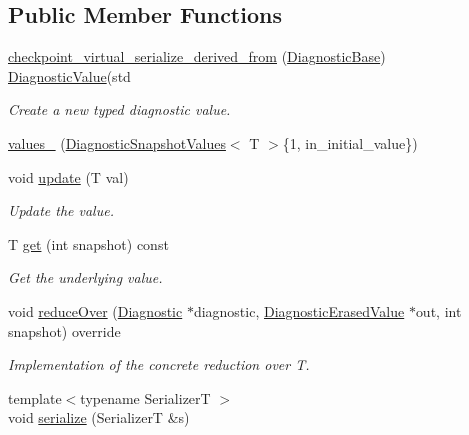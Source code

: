 \subsection*{Public Member Functions}
\begin{DoxyCompactItemize}
\item 
\hyperlink{structvt_1_1runtime_1_1component_1_1detail_1_1_diagnostic_value_a93e99556ebd3b6ec6a23d63dcd4cf81a}{checkpoint\+\_\+virtual\+\_\+serialize\+\_\+derived\+\_\+from} (\hyperlink{structvt_1_1runtime_1_1component_1_1detail_1_1_diagnostic_base}{Diagnostic\+Base}) \hyperlink{structvt_1_1runtime_1_1component_1_1detail_1_1_diagnostic_value}{Diagnostic\+Value}(std
\begin{DoxyCompactList}\small\item\em Create a new typed diagnostic value. \end{DoxyCompactList}\item 
\hyperlink{structvt_1_1runtime_1_1component_1_1detail_1_1_diagnostic_value_afb539e5bf7b2a7cc09298f731c6705a3}{values\+\_\+} (\hyperlink{structvt_1_1runtime_1_1component_1_1detail_1_1_diagnostic_snapshot_values}{Diagnostic\+Snapshot\+Values}$<$ T $>$\{1, in\+\_\+initial\+\_\+value\})
\item 
void \hyperlink{structvt_1_1runtime_1_1component_1_1detail_1_1_diagnostic_value_a7d976c2d528e5780520ee1f1b8dfddb9}{update} (T val)
\begin{DoxyCompactList}\small\item\em Update the value. \end{DoxyCompactList}\item 
T \hyperlink{structvt_1_1runtime_1_1component_1_1detail_1_1_diagnostic_value_aef8559dc2c3acb7ac9e52dfe94bc0b3a}{get} (int snapshot) const
\begin{DoxyCompactList}\small\item\em Get the underlying value. \end{DoxyCompactList}\item 
void \hyperlink{structvt_1_1runtime_1_1component_1_1detail_1_1_diagnostic_value_aa7bcf117cb8a70cee25cfd4522ca0b68}{reduce\+Over} (\hyperlink{structvt_1_1runtime_1_1component_1_1_diagnostic}{Diagnostic} $\ast$diagnostic, \hyperlink{structvt_1_1runtime_1_1component_1_1_diagnostic_erased_value}{Diagnostic\+Erased\+Value} $\ast$out, int snapshot) override
\begin{DoxyCompactList}\small\item\em Implementation of the concrete reduction over {\ttfamily T}. \end{DoxyCompactList}\item 
{\footnotesize template$<$typename SerializerT $>$ }\\void \hyperlink{structvt_1_1runtime_1_1component_1_1detail_1_1_diagnostic_value_a289e9cac639fb1284a19d5d6dda558a1}{serialize} (SerializerT \&s)
\end{DoxyCompactItemize}
